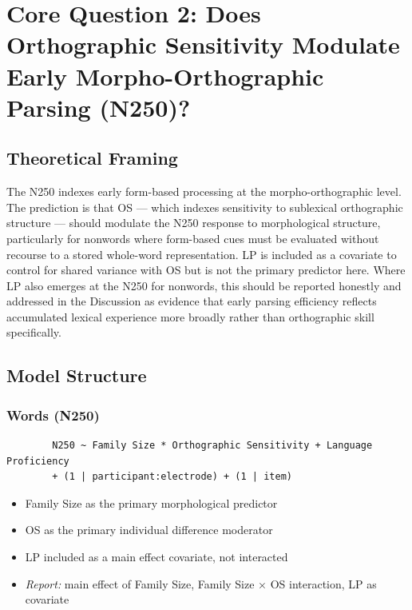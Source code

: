 \documentclass[12pt]{article}
\begin{document}
	\section{Core Question 2: Does Orthographic Sensitivity Modulate Early Morpho-Orthographic Parsing (N250)?}
	
	\subsection{Theoretical Framing}
	
	The N250 indexes early form-based processing at the morpho-orthographic level. The prediction is that OS --- which indexes sensitivity to sublexical orthographic structure --- should modulate the N250 response to morphological structure, particularly for nonwords where form-based cues must be evaluated without recourse to a stored whole-word representation. LP is included as a covariate to control for shared variance with OS but is not the primary predictor here. Where LP also emerges at the N250 for nonwords, this should be reported honestly and addressed in the Discussion as evidence that early parsing efficiency reflects accumulated lexical experience more broadly rather than orthographic skill specifically.
	
	\subsection{Model Structure}
	
	\subsubsection{Words (N250)}
	
	\begin{verbatim}
		N250 ~ Family Size * Orthographic Sensitivity + Language Proficiency
		+ (1 | participant:electrode) + (1 | item)
	\end{verbatim}
	
	\begin{itemize}
		\item Family Size as the primary morphological predictor
		\item OS as the primary individual difference moderator
		\item LP included as a main effect covariate, not interacted
		\item \textit{Report:} main effect of Family Size, Family Size $\times$ OS interaction, LP as covariate
	\end{itemize}
	
\end{document}

